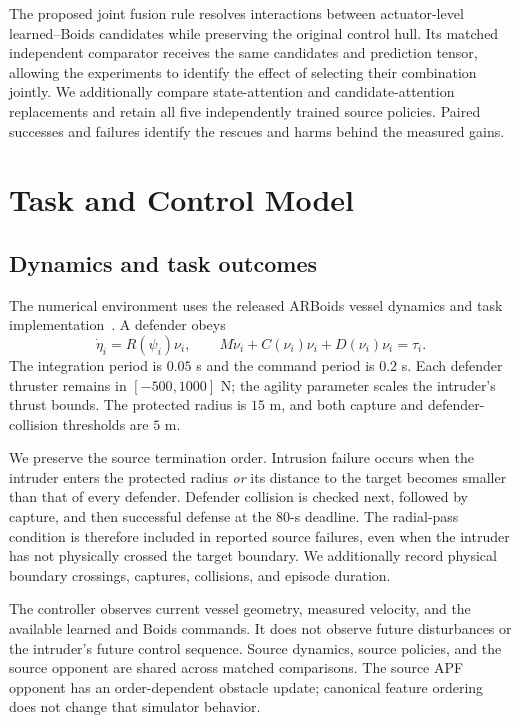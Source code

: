\documentclass[journal]{IEEEtran}
\begin{document}
The proposed joint fusion rule resolves interactions between actuator-level learned--Boids candidates while preserving the original control hull. Its matched independent comparator receives the same candidates and prediction tensor, allowing the experiments to identify the effect of selecting their combination jointly. We additionally compare state-attention and candidate-attention replacements and retain all five independently trained source policies. Paired successes and failures identify the rescues and harms behind the measured gains.

\section{Task and Control Model}
\subsection{Dynamics and task outcomes}
The numerical environment uses the released ARBoids vessel dynamics and task implementation~\cite{tao}. A defender obeys
\begin{equation}
 \dot{\eta}_i=R(\psi_i)\nu_i,\qquad
 M\dot{\nu}_i+C(\nu_i)\nu_i+D(\nu_i)\nu_i=\tau_i .
\end{equation}
The integration period is $0.05$ s and the command period is $0.2$ s. Each defender thruster remains in $[-500,1000]$ N; the agility parameter scales the intruder's thrust bounds. The protected radius is $15$ m, and both capture and defender-collision thresholds are $5$ m.

We preserve the source termination order. Intrusion failure occurs when the intruder enters the protected radius \emph{or} its distance to the target becomes smaller than that of every defender. Defender collision is checked next, followed by capture, and then successful defense at the $80$-s deadline. The radial-pass condition is therefore included in reported source failures, even when the intruder has not physically crossed the target boundary. We additionally record physical boundary crossings, captures, collisions, and episode duration.

The controller observes current vessel geometry, measured velocity, and the available learned and Boids commands. It does not observe future disturbances or the intruder's future control sequence. Source dynamics, source policies, and the source opponent are shared across matched comparisons. The source APF opponent has an order-dependent obstacle update; canonical feature ordering does not change that simulator behavior.
\end{document}
